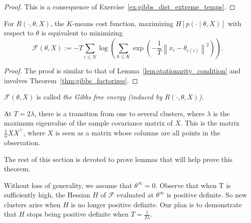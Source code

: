 \begin{proof}
This is a consequence of Exercise~\ref{ex:gibbs_dist_extreme_temps}.
\end{proof}

\begin{lemma}
For $R(\cdot, \theta, X)$, the $K$-means cost function, maximizing $H[p(\cdot \mid \theta, X)]$ with respect to $\theta$ is equivalent to minimizing
%
\begin{equation}
\mathcal{F}(\theta, X) := -T \sum_{i \leq N}\log \left(\sum_{k \leq K}\exp\left(-\frac{1}{T}\left\|x_i - \theta_{c(i)}\right\|^2\right)\right).
\label{eq:gibbs_free_energy_da}
\end{equation}
%
\label{lem:max_ent_is_min_free_energy_da}
\end{lemma}

\begin{proof}
The proof is similar to that of Lemma~\ref{lem:stationarity_condition} and involves Theorem~\ref{thm:gibbs_factorizes}.
\end{proof}

$\mathcal{F}\left(\theta, X\right)$ is called \emph{the Gibbs free energy (induced by $R(\cdot, \theta, X)$)}.

\begin{theorem}
At $T = 2\lambda$, there is a transition from one to several clusters, where $\lambda$ is the maximum eigenvalue of the sample covariance matrix of $X$. This is the matrix $\frac{1}{n}XX^\top$, where $X$ is seen as a matrix whose columns are all points in the observation.
\label{thm:critical_temp_da}
\end{theorem}

The rest of this section is devoted to prove lemmas that will help prove
this theorem.

Without loss of generality, we assume that $\theta^\infty = 0$. Observe that
when T is sufficiently high, the Hessian $H$ of $\mathcal{F}$ evaluated at $\theta^\infty$ is positive
definite. So new clusters arise when $H$ is no longer positive definite. Our plan is to demonstrate that $H$ stops being positive definite when $T = \frac{1}{2\lambda}$.

